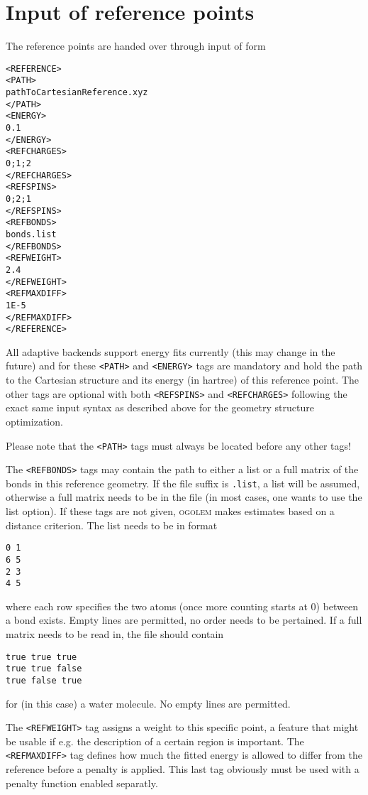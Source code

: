 \documentclass[a4paper,10pt]{scrbook}
\newcommand{\ogo}{\textsc{ogolem}}
\begin{document}
\section{Input of reference points}
The reference points are handed over through input of form
\begin{verbatim}
<REFERENCE>
<PATH>
pathToCartesianReference.xyz
</PATH>
<ENERGY>
0.1
</ENERGY>
<REFCHARGES>
0;1;2
</REFCHARGES>
<REFSPINS>
0;2;1
</REFSPINS>
<REFBONDS>
bonds.list
</REFBONDS>
<REFWEIGHT>
2.4
</REFWEIGHT>
<REFMAXDIFF>
1E-5
</REFMAXDIFF>
</REFERENCE>
\end{verbatim}
All adaptive backends support energy fits currently (this may change in the future) and for these \texttt{<PATH>} and \texttt{<ENERGY>} tags are mandatory and hold the
path to the Cartesian structure and its energy (in hartree) of this reference
point. The other tags are optional with both \texttt{<REFSPINS>} and
\texttt{<REFCHARGES>} following the exact same input syntax as described above
for the geometry structure optimization.

Please note that the \texttt{<PATH>} tags must always be located before any 
other tags!

The \texttt{<REFBONDS>} tags may contain the path to either a list or a full
matrix of the bonds in this reference geometry. If the file suffix is
\texttt{.list}, a list will be assumed, otherwise a full matrix needs to be in
the file (in most cases, one wants to use the list option). If these tags are
not given, \ogo{} makes estimates based on a distance criterion. The list needs
to be in format
\begin{verbatim}
0 1
6 5
2 3
4 5
\end{verbatim}
where each row specifies the two atoms (once more counting starts at 0) between
a bond exists. Empty lines are permitted, no order needs to be pertained. If a
full matrix needs to be read in, the file should contain
\begin{verbatim}
true true true
true true false
true false true
\end{verbatim}
for (in this case) a water molecule. No empty lines are permitted.

The \texttt{<REFWEIGHT>} tag assigns a
weight to this specific point, a feature that might be usable if e.g. the
description of a certain region is important. The \texttt{<REFMAXDIFF>} tag
defines how much the fitted energy is allowed to differ from the reference
before a penalty is applied. This last tag obviously must be used with a penalty
function enabled separatly.
\end{document}
